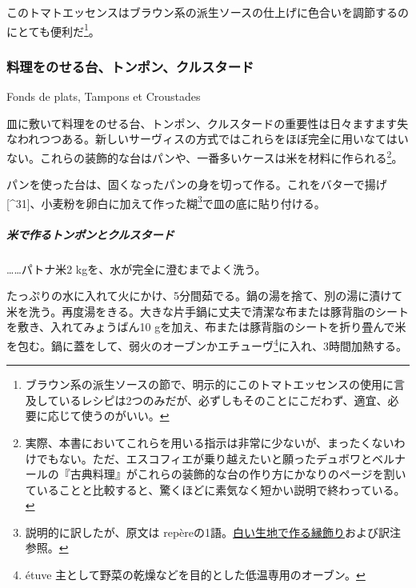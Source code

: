 \begin{recette}
このトマトエッセンスはブラウン系の派生ソースの仕上げに色合いを調節するのにとても便利だ\footnote{ブラウン系の派生ソースの節で、明示的にこのトマトエッセンスの使用に言及しているレシピは2つのみだが、必ずしもそのことにこだわず、適宜、必要に応じて使うのがいい。}。

\atoaki{}

\hypertarget{fonds-de-plats}{%
\subsubsection{料理をのせる台、トンポン、クルスタード}\label{fonds-de-plats}}

\begin{frsubenv}

Fonds de plats, Tampons et Croustades

\end{frsubenv}

 
 

皿に敷いて料理をのせる台、トンポン、クルスタードの重要性は日々ますます失なわれつつある。新しいサーヴィスの方式ではこれらをほぼ完全に用いなてはいない。これらの装飾的な台はパンや、一番多いケースは米を材料に作られる\footnote{実際、本書においてこれらを用いる指示は非常に少ないが、まったくないわけでもない。ただ、エスコフィエが乗り越えたいと願ったデュボワとベルナールの『古典料理』がこれらの装飾的な台の作り方にかなりのページを割いていることと比較すると、驚くほどに素気なく短かい説明で終わっている。}。

パンを使った台は、固くなったパンの身を切って作る。これをバターで揚げ
{[}\^{}31{]}、小麦粉を卵白に加えて作った糊\footnote{説明的に訳したが、原文は
  repèreの1語。\protect\hyperlink{bordures-en-pate-blanche}{白い生地で作る縁飾り}および訳注参照。}で皿の底に貼り付ける。

\hypertarget{ux7c73ux3067ux4f5cux308bux30c8ux30f3ux30ddux30f3ux3068ux30afux30ebux30b9ux30bfux30fcux30c9}{%
\subparagraph{米で作るトンポンとクルスタード}\label{ux7c73ux3067ux4f5cux308bux30c8ux30f3ux30ddux30f3ux3068ux30afux30ebux30b9ux30bfux30fcux30c9}}

\ldots{}\ldots{}パトナ米2 kgを、水が完全に澄むまでよく洗う。

たっぷりの水に入れて火にかけ、5分間茹でる。鍋の湯を捨て、別の湯に漬けて米を洗う。再度湯をきる。大きな片手鍋に丈夫で清潔な布または豚背脂のシートを敷き、入れてみょうばん10
\nolinebreak[4]gを加え、布または豚背脂のシートを折り畳んで米を包む。鍋に蓋をして、弱火のオーブンかエチューヴ\footnote{étuve
  主として野菜の乾燥などを目的とした低温専用のオーブン。}に入れ、3時間加熱する。


\end{recette}
